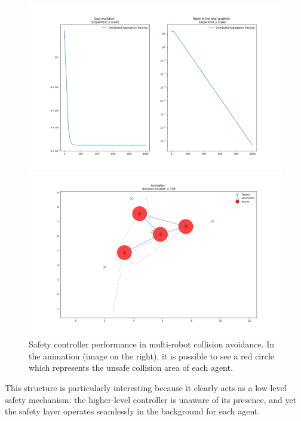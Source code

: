\begin{figure}[H]
  \begin{minipage}{0.5\textwidth}
    \includegraphics[width=\linewidth]{report/figs/safety_contr.png}
  \end{minipage}%
  \hfill
  \begin{minipage}{0.5\textwidth}
    \includegraphics[width=\linewidth]{report/figs/safety_animation.png}
  \end{minipage}%
  \caption{Safety controller performance in multi-robot collision avoidance. In the animation (image on the right), it is possible to see a red circle which represents the unsafe collision area of each agent.}
  \label{fig:rviz_result}
\end{figure}

This structure is particularly interesting because it clearly acts as a low-level safety mechanism: the higher-level controller is unaware of its presence, and yet the safety layer operates seamlessly in the background for each agent.

